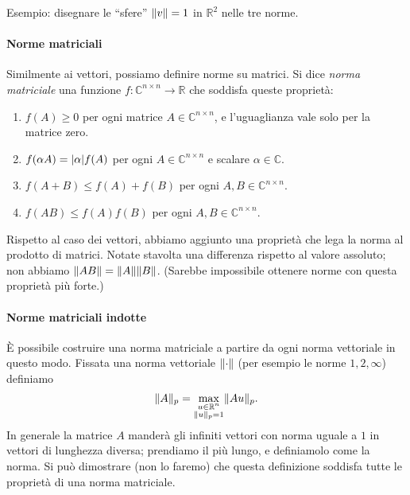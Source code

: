 \documentclass[a4paper]{report}
\DeclarePairedDelimiter{\abs}{\lvert}{\rvert}
\DeclarePairedDelimiter{\norm}{\lVert}{\rVert}
\theoremstyle{definiton}
\theoremstyle{remark}
\begin{document}
Esempio: disegnare le ``sfere'' $\norm{v}=1$ in $\mathbb{R}^2$ nelle tre norme.

\paragraph{Norme matriciali}

Similmente ai vettori, possiamo definire norme su matrici. Si dice \emph{norma matriciale} una funzione $f: \mathbb{C}^{n\times n} \to \mathbb{R}$ che soddisfa queste proprietà:
\begin{enumerate}
    \item $f(A) \geq 0$ per ogni matrice $A\in\mathbb{C}^{n\times n}$, e l'uguaglianza vale solo per la matrice zero.
    \item $f(\alpha A) = \abs{\alpha} f(A)$ per ogni $A\in\mathbb{C}^{n\times n}$ e scalare $\alpha \in \mathbb{C}$.
    \item $f(A+B) \leq f(A) + f(B)$ per ogni $A,B\in\mathbb{C}^{n\times n}$.
    \item $f(AB) \leq f(A)f(B)$ per ogni $A,B\in\mathbb{C}^{n\times n}$.
\end{enumerate}
Rispetto al caso dei vettori, abbiamo aggiunto una proprietà che lega la norma al prodotto di matrici. Notate stavolta una differenza rispetto al valore assoluto; non abbiamo $\norm{AB} = \norm{A}\norm{B}$. (Sarebbe impossibile ottenere norme con questa proprietà più forte.)

\paragraph{Norme matriciali indotte}

È possibile costruire una norma matriciale a partire da ogni norma vettoriale in questo modo. Fissata una norma vettoriale $\norm{\cdot}$ (per esempio le norme $1,2,\infty$) definiamo
\begin{equation} \label{normamatriciale}
    \norm{A}_p = \max_{\substack{u\in\mathbb{R}^n \\ \norm{u}_p=1}} \norm{Au}_p.
\end{equation}
In generale la matrice $A$ manderà gli infiniti vettori con norma uguale a $1$ in vettori di lunghezza diversa; prendiamo il più lungo, e definiamolo come la norma. Si può dimostrare (non lo faremo) che questa definizione soddisfa tutte le proprietà di una norma matriciale.
\end{document}
